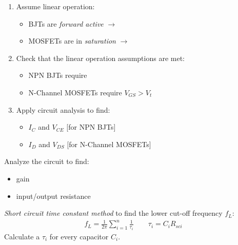 \begin{CheatsheetEntryFrame}
    \bigskip
    \SoftHLine

    \begin{MulticolsSoftSepRule}{2}

        \begin{enumerate}
            \item Assume linear operation:
            \begin{itemize}
                \item BJTs are \emph{forward active} $\to$ \Todo{}
                \item MOSFETs are in \emph{saturation} $\to$ \Todo{}
            \end{itemize}
            \item Check that the linear operation assumptions are met:
            \begin{itemize}
                \item NPN BJTs require 
                \item N-Channel MOSFETs require $V_{GS} > V_t$
            \end{itemize}
            \item Apply circuit analysis to find:
            \begin{itemize}
                \item $I_C$ and $V_{CE}$ {\footnotesize {}[for NPN BJTs]}
                \item $I_D$ and $V_{DS}$ {\footnotesize {}[for N-Channel MOSFETs]}
            \end{itemize}
        \end{enumerate}

        \bigskip
        \SoftHLine
        \bigskip


        Analyze the circuit to find:
        \begin{itemize}
            \item gain
            \item input/output resistance
        \end{itemize}

        \MulticolsBreak


        \emph{Short circuit time constant method} to find the \linebreak lower cut-off frequency $f_L$:
        \begin{gather*}
            f_L
            = \frac{1}{2 \pi}
            \sum_{i=1}^n \frac{1}{\tau_i}
            \qquad
            \tau_i = C_i R_{sci}
        \end{gather*}
        Calculate a $\tau_i$ for every capacitor $C_i$.


\end{MulticolsSoftSepRule}
\end{CheatsheetEntryFrame}

